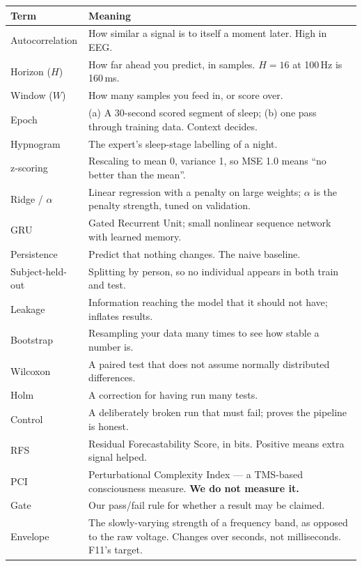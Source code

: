 \documentclass[11pt]{article}
\begin{document}
\begin{center}\small
\begin{longtable}{p{}p{}}
\toprule
\textbf{Term} & \textbf{Meaning} \\
\midrule
Autocorrelation & How similar a signal is to itself a moment later. High in EEG. \\
Horizon ($H$) & How far ahead you predict, in samples. $H=16$ at 100\,Hz is 160\,ms. \\
Window ($W$) & How many samples you feed in, or score over. \\
Epoch & (a) A 30-second scored segment of sleep; (b) one pass through training data. Context decides. \\
Hypnogram & The expert's sleep-stage labelling of a night. \\
z-scoring & Rescaling to mean 0, variance 1, so MSE 1.0 means ``no better than the mean''. \\
Ridge / $\alpha$ & Linear regression with a penalty on large weights; $\alpha$ is the penalty strength, tuned on validation. \\
GRU & Gated Recurrent Unit; small nonlinear sequence network with learned memory. \\
Persistence & Predict that nothing changes. The naive baseline. \\
Subject-held-out & Splitting by person, so no individual appears in both train and test. \\
Leakage & Information reaching the model that it should not have; inflates results. \\
Bootstrap & Resampling your data many times to see how stable a number is. \\
Wilcoxon & A paired test that does not assume normally distributed differences. \\
Holm & A correction for having run many tests. \\
Control & A deliberately broken run that must fail; proves the pipeline is honest. \\
RFS & Residual Forecastability Score, in bits. Positive means extra signal helped. \\
PCI & Perturbational Complexity Index --- a TMS-based consciousness measure. \textbf{We do not measure it.} \\
Gate & Our pass/fail rule for whether a result may be claimed. \\
Envelope & The slowly-varying strength of a frequency band, as opposed to the raw voltage. Changes over seconds, not milliseconds. F11's target. \\

\end{longtable}
\end{center}
\end{document}
